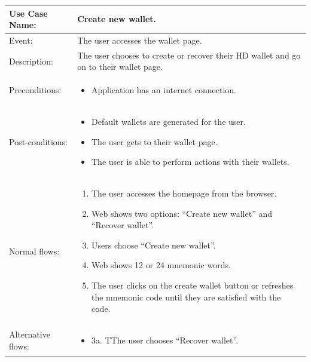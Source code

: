 \begin{table}[]
    \begin{tabular}{| m{4cm} | m{11cm} |}
        \hline
        Use Case Name:     & Create new wallet.                                                                    \\ \hline
        Event:             & The user accesses the wallet page.                                                    \\ \hline
        Description:       & The user chooses to create or recover their HD wallet and go on to their wallet page. \\ \hline
        Preconditions:     & \begin{itemize}
            \item Application has an internet connection.
        \end{itemize}                                                            \\ \hline
        Post-conditions:   & \begin{itemize}
            \item Default wallets are generated for the user.
            \item The user gets to their wallet page.
            \item The user is able to perform actions with their wallets.
        \end{itemize}                                                            \\ \hline
        Normal flows:      & \begin{enumerate}
            \item The user accesses the homepage from the browser.
            \item Web shows two options: “Create new wallet” and “Recover wallet”.
            \item Users choose “Create new wallet”.
            \item Web shows 12 or 24 mnemonic words.
            \item The user clicks on the create wallet button or refreshes the mnemonic code until they are satisfied with the code.
        \end{enumerate}                                                            \\ \hline
        Alternative flows: & \begin{itemize}
            \item {3a. TThe user chooses “Recover wallet”.}

\end{itemize}
\end{tabular}
\end{table}

